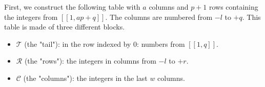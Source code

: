 First, we construct the following table with \(a\) columns and \(p+1\) rows containing the integers from \([\![1, ap + q]\!]\). 
The columns are numbered from \(-l\) to \(+q\). This table is made of three different blocks.

\begin{itemize}
	\item \(\mathcal{T}\) (the "tail"): in the row indexed by 0: numbers from \([\![1,q]\!]\).
	\item \(\mathcal{R}\) (the "rows"): the integers in columns from \(-l\) to \(+r\).
	\item \(\mathcal{C}\) (the "columns"): the integers in the last \(w\) columns.
\end{itemize}

\renewcommand{\arraystretch}{1.7}
\setlength{\arraycolsep}{3pt}

